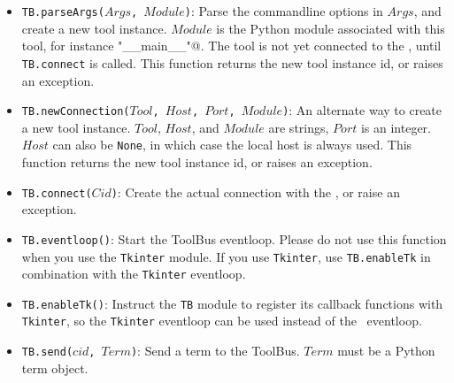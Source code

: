 \begin{itemize}

\item {\tt TB.parseArgs($Args$, $Module$)}:  Parse the commandline
      options in $Args$, and create a new tool instance. $Module$ is
      the Python module associated with this tool, for instance
      \verb@ "__main__"@. The tool is not yet connected to the \TB, until
      {\tt TB.connect} is called. This function returns the new tool
      instance id, or raises an exception.

\item {\tt TB.newConnection($Tool$, $Host$, $Port$, $Module$)}: An alternate
      way to create a new tool instance. $Tool$, $Host$, and $Module$ are
      strings, $Port$ is an integer. $Host$ can also be {\tt None}, in which
      case the local host is always used. This function returns the new
      tool instance id, or raises an exception.

\item {\tt TB.connect($Cid$)}: Create the actual connection with the \TB,
      or raise an exception.

\item {\tt TB.eventloop()}: Start the ToolBus eventloop. Please do not use
      this function when you use the {\tt Tkinter} module. If you use
      {\tt Tkinter}, use {\tt TB.enableTk} in combination with the
      {\tt Tkinter} eventloop.

\item {\tt TB.enableTk()}: Instruct the {\tt TB} module to register
      its callback functions with {\tt Tkinter}, so the {\tt Tkinter}
      eventloop can be used instead of the \TB\ eventloop.

\item {\tt TB.send($cid$, $Term$)}: Send a term to the ToolBus. $Term$ must
      be a Python term object.


\end{itemize}
